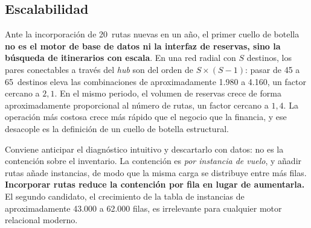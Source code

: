 \documentclass[10pt,letterpaper]{article}
\begin{document}
\subsection{Escalabilidad}
Ante la incorporación de 20~rutas nuevas en un año, el primer cuello de botella \textbf{no es el motor de base de datos ni la interfaz de reservas, sino la búsqueda de itinerarios con escala}. En una red radial con $S$ destinos, los pares conectables a través del \emph{hub} son del orden de $S \times (S-1)$: pasar de 45 a 65~destinos eleva las combinaciones de aproximadamente 1.980 a 4.160, un factor cercano a $2{,}1$. En el mismo periodo, el volumen de reservas crece de forma aproximadamente proporcional al número de rutas, un factor cercano a $1{,}4$. La operación más costosa crece más rápido que el negocio que la financia, y ese desacople es la definición de un cuello de botella estructural.

Conviene anticipar el diagnóstico intuitivo y descartarlo con datos: no es la contención sobre el inventario. La contención es \emph{por instancia de vuelo}, y añadir rutas añade instancias, de modo que la misma carga se distribuye entre más filas. \textbf{Incorporar rutas reduce la contención por fila en lugar de aumentarla.} El segundo candidato, el crecimiento de la tabla de instancias de aproximadamente 43.000 a 62.000 filas, es irrelevante para cualquier motor relacional moderno.
\end{document}
